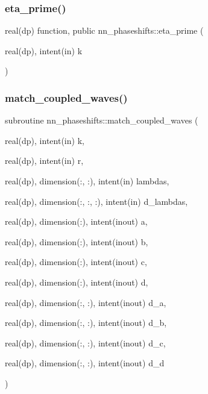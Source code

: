 \mbox{\label{namespacenn__phaseshifts_af570a5386b15b626b75fe46125ae0abe}} 
\subsubsection{\texorpdfstring{eta\+\_\+prime()}{eta\_prime()}}
{\footnotesize\ttfamily real(dp) function, public nn\+\_\+phaseshifts\+::eta\+\_\+prime (\begin{DoxyParamCaption}\item[{real(dp), intent(in)}]{k }\end{DoxyParamCaption})}

\mbox{\label{namespacenn__phaseshifts_a06ad5d92bcc80ec0ffd8320854595af6}} 
\subsubsection{\texorpdfstring{match\+\_\+coupled\+\_\+waves()}{match\_coupled\_waves()}}
{\footnotesize\ttfamily subroutine nn\+\_\+phaseshifts\+::match\+\_\+coupled\+\_\+waves (\begin{DoxyParamCaption}\item[{real(dp), intent(in)}]{k,  }\item[{real(dp), intent(in)}]{r,  }\item[{real(dp), dimension(\+:, \+:), intent(in)}]{lambdas,  }\item[{real(dp), dimension(\+:, \+:, \+:), intent(in)}]{d\+\_\+lambdas,  }\item[{real(dp), dimension(\+:), intent(inout)}]{a,  }\item[{real(dp), dimension(\+:), intent(inout)}]{b,  }\item[{real(dp), dimension(\+:), intent(inout)}]{c,  }\item[{real(dp), dimension(\+:), intent(inout)}]{d,  }\item[{real(dp), dimension(\+:, \+:), intent(inout)}]{d\+\_\+a,  }\item[{real(dp), dimension(\+:, \+:), intent(inout)}]{d\+\_\+b,  }\item[{real(dp), dimension(\+:, \+:), intent(inout)}]{d\+\_\+c,  }\item[{real(dp), dimension(\+:, \+:), intent(inout)}]{d\+\_\+d }\end{DoxyParamCaption})\hspace{0.3cm}{\ttfamily [private]}}



